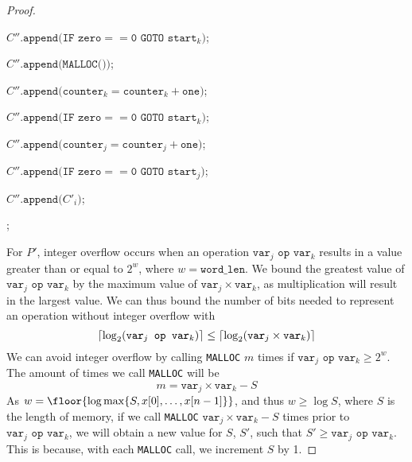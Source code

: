 \documentclass[11pt]{scrartcl}
\theoremstyle{dotlessP}
\theoremstyle{dotlessN}
\DeclarePairedDelimiter\ceil{\lceil}{\rceil} %
\DeclarePairedDelimiter\set{\{}{\}}
\begin{document}
\begin{enumerate}[(a)]
\begin{proof}
\begin{algorithm}
{{{	 $C''\texttt{.append($\texttt{IF } \texttt{zero} == \texttt{0} \texttt{ GOTO } \texttt{start}_k$)}$;

			 $C''\texttt{.append(MALLOC())}$;


			 $C''\texttt{.append($\texttt{counter}_k = \texttt{counter}_k + \texttt{one}$)}$;

			 $C''\texttt{.append($\texttt{IF } \texttt{zero} == \texttt{0} \texttt{ GOTO } \texttt{start}_k$)}$;

			 $C''\texttt{.append($\texttt{counter}_j = \texttt{counter}_j + \texttt{one}$)}$;

			 $C''\texttt{.append($\texttt{IF } \texttt{zero} == \texttt{0} \texttt{ GOTO } \texttt{start}_j$)}$;
    }
	$C''\texttt{.append($C'_i$)}$;
}
	;
}\end{algorithm}

For $P'$, integer overflow occurs when an operation $\texttt{var}_j \texttt{ op } \texttt{var}_k$ results in a value greater than or equal to $2^w$, where $w = \texttt{word\_len}$.
	We bound the greatest value of $\texttt{var}_j \texttt{ op } \texttt{var}_k$ by the maximum value of  $\texttt{var}_j \times \texttt{var}_k$, as multiplication will result in the largest value. We can thus bound the number of bits needed to represent an operation without integer overflow with
			\[
				\ceil*{\log_2(\texttt{var}_j \texttt{ op } \texttt{var}_k)} \leq \ceil*{\log_2(\texttt{var}_j \times \texttt{var}_k)}
			\] 
		We can avoid integer overflow by calling \texttt{MALLOC} $m$ times if $\texttt{var}_j \texttt{ op } \texttt{var}_k \geq 2^w$. The amount of times we call \texttt{MALLOC} will be 
					\[
	m =						\texttt{var}_j \times \texttt{var}_k - S
					\] 
					As $w = \floor{\log \max \set*{S, x[0], \dots, x[n-1]}}$, and thus  $w \geq \log S$, where $S$ is the length of memory, if we call \texttt{MALLOC} $\texttt{var}_j \times \texttt{var}_k - S$ times prior to $\texttt{var}_j \texttt{ op } \texttt{var}_k$, we will obtain a new value for $S$, $S'$, such that $S' \geq \texttt{var}_j \texttt{ op } \texttt{var}_k$. This is because, with each \texttt{MALLOC} call, we increment $S$ by 1.
					

\end{proof}
\end{enumerate}
\end{document}
